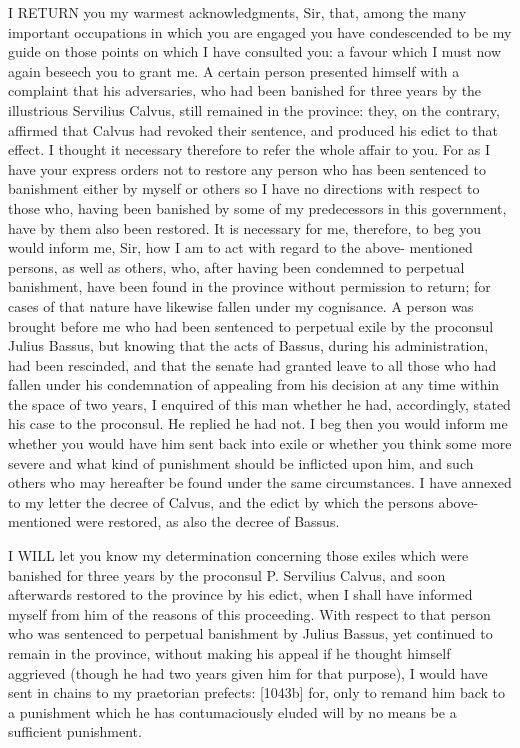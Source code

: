 I RETURN you my warmest acknowledgments, Sir, that, among the many
important occupations in which you are engaged you have condescended to be
my guide on those points on which I have consulted you: a favour which I
must now again beseech you to grant me. A certain person presented himself
with a complaint that his adversaries, who had been banished for three
years by the illustrious Servilius Calvus, still remained in the province:
they, on the contrary, affirmed that Calvus had revoked their sentence,
and produced his edict to that effect. I thought it necessary therefore to
refer the whole affair to you. For as I have your express orders not to
restore any person who has been sentenced to banishment either by myself
or others so I have no directions with respect to those who, having been
banished by some of my predecessors in this government, have by them also
been restored. It is necessary for me, therefore, to beg you would inform
me, Sir, how I am to act with regard to the above- mentioned persons, as
well as others, who, after having been condemned to perpetual banishment,
have been found in the province without permission to return; for cases of
that nature have likewise fallen under my cognisance. A person was brought
before me who had been sentenced to perpetual exile by the proconsul
Julius Bassus, but knowing that the acts of Bassus, during his
administration, had been rescinded, and that the senate had granted leave
to all those who had fallen under his condemnation of appealing from his
decision at any time within the space of two years, I enquired of this man
whether he had, accordingly, stated his case to the proconsul. He replied
he had not. I beg then you would inform me whether you would have him sent
back into exile or whether you think some more severe and what kind of
punishment should be inflicted upon him, and such others who may hereafter
be found under the same circumstances. I have annexed to my letter the
decree of Calvus, and the edict by which the persons above-mentioned were
restored, as also the decree of Bassus.


I WILL let you know my determination concerning those exiles which were
banished for three years by the proconsul P. Servilius Calvus, and soon
afterwards restored to the province by his edict, when I shall have
informed myself from him of the reasons of this proceeding. With respect
to that person who was sentenced to perpetual banishment by Julius Bassus,
yet continued to remain in the province, without making his appeal if he
thought himself aggrieved (though he had two years given him for that
purpose), I would have sent in chains to my praetorian prefects: [1043b]
for, only to remand him back to a punishment which he has contumaciously
eluded will by no means be a sufficient punishment.

